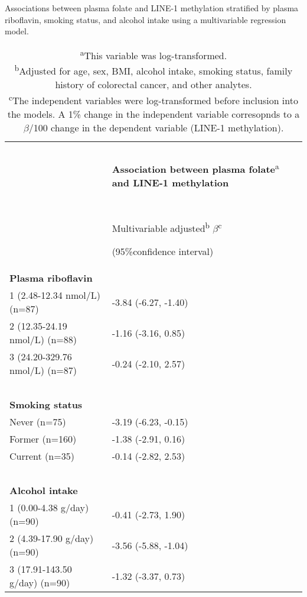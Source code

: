 \begin{table}
\caption{Associations between plasma folate and LINE-1 methylation stratified by plasma riboflavin, smoking status, and alcohol intake using a multivariable regression model.}
\label{table5_5}
\begin{tabular}{L{5.5cm}C{6.5cm}}

\hline
~ & ~\\
 ~ & %
\textbf{Association between plasma folate}\textsuperscript{a}
\textbf{and LINE-1 methylation}\\
~ & ~\\
~ & { Multivariable adjusted\textsuperscript{b}}{ $\beta $\textsuperscript{c}}

(95\%confidence interval)\\
\hline
\textbf{Plasma riboflavin} & ~ \\
1 (2.48-12.34 nmol/L) (n=87) & -3.84 (-6.27, -1.40)\\
2 (12.35-24.19 nmol/L) (n=88) & -1.16 (-3.16, 0.85)\\
3 (24.20-329.76 nmol/L) (n=87) & -0.24 (-2.10, 2.57)\\
~ & ~ \\
\textbf{Smoking status} & ~ \\
Never (n=75) & -3.19 (-6.23, -0.15)\\
Former (n=160) & -1.38 (-2.91, 0.16)\\
Current (n=35) & -0.14 (-2.82, 2.53)\\
~ & ~ \\
\textbf{Alcohol intake} & ~ \\
1 (0.00-4.38 g/day) (n=90) & -0.41 (-2.73, 1.90)\\
2 (4.39-17.90 g/day) (n=90) & -3.56 (-5.88, -1.04)\\
3 (17.91-143.50 g/day) (n=90) & -1.32 (-3.37, 0.73)\\
\hline
\end{tabular}
\caption*{\footnotesize{\textsuperscript{a}This variable was log-transformed.\\\textsuperscript{b}Adjusted for age, sex, BMI, alcohol intake, smoking status, family history of colorectal cancer, and other analytes.\\\textsuperscript{c}The independent variables were log-transformed before inclusion into the models. A 1\% change in the independent variable corresopnds to a $\beta$/100 change in the dependent variable (LINE-1 methylation).}}
\end{table}

